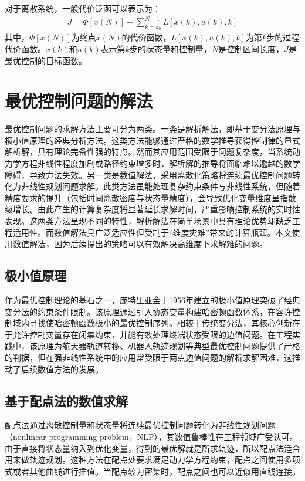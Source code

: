 \documentclass[master,academic]{ysuthesis} %
\begin{document}
	对于离散系统，一般代价泛函可以表示为：
	\begin{equation}
		\begin{aligned}
			J = \Phi[x(N)]+\sum_{k=k_0}^{N-1}L[x(k),u(k),k]
		\end{aligned}
	\end{equation}
	其中，$\Phi[x(N)]$为终点$x(N)$的代价函数，$L[x(k),u(k),k]$为第$k$步的过程代价函数。$x(k)$和$u(k)$表示第$k$步的状态量和控制量，$N$是控制区间长度，$J$是最优控制的目标函数。

	\section{最优控制问题的解法}
	最优控制问题的求解方法主要可分为两类。一类是解析解法，即基于变分法原理与极小值原理的经典分析方法。这类方法能够通过严格的数学推导获得控制律的显式解析解，具有理论完备性强的特点。然而其应用范围受限于问题复杂度，当系统动力学方程非线性程度加剧或路径约束增多时，解析解的推导将面临难以逾越的数学障碍，导致方法失效。另一类是数值解法，采用离散化策略将连续最优控制问题转化为非线性规划问题求解。此类方法虽能处理复杂约束条件与非线性系统，但随着精度要求的提升（包括时间离散密度与状态量精度），会导致优化变量维度呈指数级增长。由此产生的计算复杂度将显著延长求解时间，严重影响控制系统的实时性表现。这两类方法呈现不同的特性，解析解法在简单场景中具有理论优势却缺乏工程适用性。而数值解法具广泛适应性但受制于“维度灾难”带来的计算瓶颈。本文使用数值解法，因为后续提出的策略可以有效解决高维度下求解难的问题。
	\subsection{极小值原理}
	作为最优控制理论的基石之一，庞特里亚金于1956年建立的极小值原理突破了经典变分法的约束条件限制。该原理通过引入协态变量构建哈密顿函数体系，在容许控制域内寻找使哈密顿函数极小的最优控制序列。相较于传统变分法，其核心创新在于允许控制变量存在闭集约束，并能有效处理终端状态受限的边值问题。在工程实践中，该原理为航天器轨道转移、机器人轨迹规划等典型最优控制问题提供了严格的判据，但在强非线性系统中的应用常受限于两点边值问题的解析求解困难，这推动了后续数值方法的发展。
	
	\subsection{基于配点法的数值求解}
	配点法通过离散控制量和状态量将连续最优控制问题转化为非线性规划问题（nonlinear programming problem，NLP），其数值鲁棒性在工程领域广受认可。由于直接将状态量纳入到优化变量，得到的最优解就是所求轨迹，所以配点法适合用来做轨迹规划。这种方法在配点处要求满足动力学方程约束，配点之间使用多项式或者其他曲线进行插值。当配点较为密集时，配点之间也可以近似用直线连接。
\end{document}
